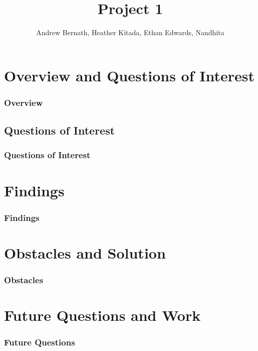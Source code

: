 \documentclass{beamer}
\title{Project 1}
\author{Andrew Bernath, Heather Kitada, Ethan Edwards, Nandhita}
\institute{Oregon State University}
\date
\begin{document}
\begin{frame}
\titlepage
\end{frame}

\begin{frame}{\contentsname}
\begin{multicols}{2}
\tableofcontents
\end{multicols}
\end{frame}

\section{Overview and Questions of Interest}
\begin{frame}
\frametitle{Overview }

\end{frame}

\subsection{Questions of Interest}
\begin{frame}
\frametitle{Questions of Interest }

\end{frame}

\section{Findings}
\begin{frame}
\frametitle{Findings}


\end{frame}

\section{Obstacles and Solution }
\begin{frame}
\frametitle{Obstacles}

\end{frame}

\section{Future Questions and Work}
\begin{frame}
\frametitle{Future Questions}

\end{frame}
\end{document}
